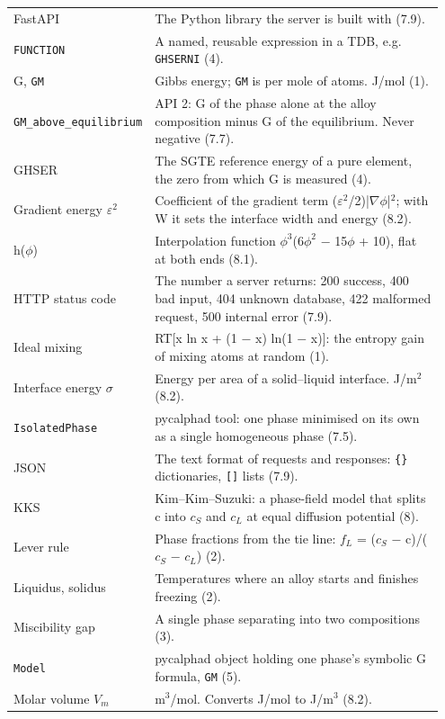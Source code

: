 \documentclass[12pt,a4paper]{article}
\begin{document}
\begin{longtable}{>{\raggedright\arraybackslash}p{0.202\linewidth}>{\raggedright\arraybackslash}p{0.745\linewidth}}
FastAPI & The Python library the server is built with (7.9). \\
\texttt{FUNCTION} & A named, reusable expression in a TDB, e.g. \texttt{GHSERNI} (4). \\
G, \texttt{GM} & Gibbs energy; \texttt{GM} is per mole of atoms. J/mol (1). \\
\texttt{GM\_\allowbreak{}above\_\allowbreak{}equilibrium} & API 2: G of the phase alone at the alloy composition minus G of the equilibrium. Never negative (7.7). \\
GHSER & The SGTE reference energy of a pure element, the zero from which G is measured (4). \\
Gradient energy \(\varepsilon ^{2}\) & Coefficient of the gradient term (\(\varepsilon ^{2}\)/2)|\(\nabla \phi\)|\(^{2}\); with W it sets the interface width and energy (8.2). \\
h(\(\phi\)) & Interpolation function \(\phi ^{3}\)(6\(\phi ^{2}\) \(-\) 15\(\phi\) + 10), flat at both ends (8.1). \\
HTTP status code & The number a server returns: 200 success, 400 bad input, 404 unknown database, 422 malformed request, 500 internal error (7.9). \\
Ideal mixing & RT[x ln x + (1 \(-\) x) ln(1 \(-\) x)]: the entropy gain of mixing atoms at random (1). \\
Interface energy \(\sigma\) & Energy per area of a solid--liquid interface. J/m\(^{2}\) (8.2). \\
\texttt{IsolatedPhase} & pycalphad tool: one phase minimised on its own as a single homogeneous phase (7.5). \\
JSON & The text format of requests and responses: \texttt{\{\}} dictionaries, \texttt{[]} lists (7.9). \\
KKS & Kim--Kim--Suzuki: a phase-field model that splits c into \(c_{S}\) and \(c_{L}\) at equal diffusion potential (8). \\
Lever rule & Phase fractions from the tie line: \(f_{L}\) = (\(c_{S}\) \(-\) c)/(\(c_{S}\) \(-\) \(c_{L}\)) (2). \\
Liquidus, solidus & Temperatures where an alloy starts and finishes freezing (2). \\
Miscibility gap & A single phase separating into two compositions (3). \\
\texttt{Model} & pycalphad object holding one phase's symbolic G formula, \texttt{GM} (5). \\
Molar volume \(V_{m}\) & m\(^{3}\)/mol. Converts J/mol to J/m\(^{3}\) (8.2). \\

\end{longtable}
\end{document}
